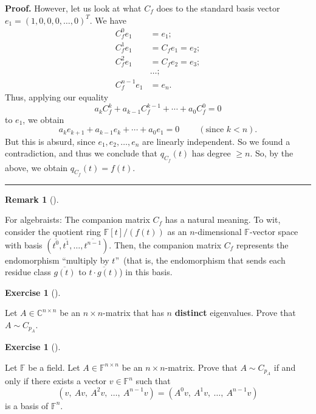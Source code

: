 \documentclass[numbers=enddot,12pt,final,onecolumn,notitlepage]{scrartcl}%
\newcounter{exer}
\numberwithin{exer}{subsection}
\theoremstyle{definition}
\newtheorem{remk}[theo]{Remark}
\newenvironment{remark}[1][]
{\begin{remk}[#1]\begin{leftbar}}
{\end{leftbar}\end{remk}}
\newtheorem{exmp}[exer]{Exercise}
\newenvironment{exercise}[1][]
{\begin{exmp}[#1]\begin{leftbar}}
{\end{leftbar}\end{exmp}}
\newenvironment{proof}[1][Proof]{\noindent\textbf{#1.} }{\ \rule{0.5em}{0.5em}}
\begin{document}
\begin{proof}
However, let us look at what $C_{f}$ does to the standard basis vector
$e_{1}=\left(  1,0,0,0,\ldots,0\right)  ^{T}$. We have%
\begin{align*}
C_{f}^{0}e_{1}  &  =e_{1};\\
C_{f}^{1}e_{1}  &  =C_{f}e_{1}=e_{2};\\
C_{f}^{2}e_{1}  &  =C_{f}e_{2}=e_{3};\\
&  \ldots;\\
C_{f}^{n-1}e_{1}  &  =e_{n}.
\end{align*}
Thus, applying our equality%
\[
a_{k}C_{f}^{k}+a_{k-1}C_{f}^{k-1}+\cdots+a_{0}C_{f}^{0}=0
\]
to $e_{1}$, we obtain%
\[
a_{k}e_{k+1}+a_{k-1}e_{k}+\cdots+a_{0}e_{1}=0\ \ \ \ \ \ \ \ \ \ \left(
\text{since }k<n\right)  .
\]
But this is absurd, since $e_{1},e_{2},\ldots,e_{n}$ are linearly independent.
So we found a contradiction, and thus we conclude that $q_{C_{f}}\left(
t\right)  $ has degree $\geq n$. So, by the above, we obtain $q_{C_{f}}\left(
t\right)  =f\left(  t\right)  $.
\end{proof}

\begin{remark}
For algebraists: The companion matrix $C_{f}$ has a natural meaning. To wit,
consider the quotient ring $\mathbb{F}\left[  t\right]  /\left(  f\left(
t\right)  \right)  $ as an $n$-dimensional $\mathbb{F}$-vector space with
basis $\left(  \overline{t^{0}},\overline{t^{1}},\ldots,\overline{t^{n-1}%
}\right)  $. Then, the companion matrix $C_{f}$ represents the endomorphism
\textquotedblleft multiply by $t$\textquotedblright\ (that is, the
endomorphism that sends each residue class $\overline{g\left(  t\right)  }$ to
$\overline{t\cdot g\left(  t\right)  }$) in this basis.
\end{remark}

\begin{exercise}
 Let $A\in\mathbb{C}^{n\times n}$ be an $n\times n$-matrix that has
$n$ \textbf{distinct} eigenvalues. Prove that $A\sim C_{p_{A}}$.
\end{exercise}

\begin{exercise}
 Let $\mathbb{F}$ be a field. Let $A\in\mathbb{F}^{n\times n}$ be an
$n\times n$-matrix. Prove that $A\sim C_{p_{A}}$ if and only if there exists a
vector $v\in\mathbb{F}^{n}$ such that
\[
\left(  v,\ Av,\ A^{2}v,\ \ldots,\ A^{n-1}v\right)  =\left(  A^{0}%
v,\ A^{1}v,\ \ldots,\ A^{n-1}v\right)
\]
is a basis of $\mathbb{F}^{n}$.
\end{exercise}
\end{document}
